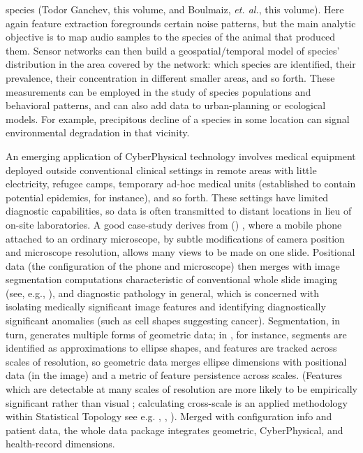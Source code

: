{\begin{description}
species (Todor Ganchev, this volume, and Boulmaiz, \textit{et. al.}, 
this volume).  Here again feature 
extraction foregrounds certain noise patterns, but the 
main analytic objective is to map audio samples to 
the species of the animal that produced them.  
Sensor networks can then build a geospatial/temporal 
model of species' distribution in the area covered by 
the network: which species are identified, their prevalence, 
their concentration in different smaller areas, and so forth.  
These measurements can be employed in the study of 
species populations and behavioral patterns, and can 
also add data to urban-planning or ecological models.  
For example, precipitous decline of a species in some 
location can signal environmental degradation in that vicinity.   
\item[Remote Medical Diagnosis]  An emerging application of 
CyberPhysical technology involves medical equipment 
deployed outside conventional clinical settings 
\mdash{} in remote areas with little electricity, refugee 
camps, temporary ad-hoc medical units (established 
to contain potential epidemics, for instance), and 
so forth.  These settings have limited diagnostic 
capabilities, so data is often transmitted to distant 
locations in lieu of on-site laboratories.  A 
good case-study derives from  
(\mWSI{}) \cite{Auguste}, where a mobile 
phone attached to an ordinary microscope, 
by subtle modifications of camera position and microscope 
resolution, allows many views to be made on one slide.  
Positional data (the configuration of the phone and microscope) 
then merges with image segmentation 
computations characteristic of 
conventional whole slide imaging (see, e.g., 
\cite{Farahani}), and diagnostic pathology 
in general, which 
is concerned with isolating medically significant image 
features and identifying diagnostically significant 
anomalies (such as cell shapes 
suggesting cancer).  Segmentation, in turn, 
generates multiple forms of geometric data; in 
\cite{KaleAksoy}, for instance, segments are 
identified as approximations to ellipse shapes, 
and features are tracked across scales of resolution, 
so geometric data merges ellipse dimensions with 
positional data (in the image) and a metric 
of feature persistence across scales.  
(Features which are detectable at many scales of 
resolution are more likely to be empirically 
significant rather than visual ; calculating 
cross-scale  is an applied 
methodology within Statistical Topology \mdash{} 
see e.g. \cite{HaneyMaxwell}, 
\cite{EdelsbrunnerHarer}, \cite{HarryStrange}).  
Merged with \mWSI{} configuration info and patient data, the 
whole data package integrates geometric, CyberPhysical, 
and health-record dimensions. 
  

\end{description}}
